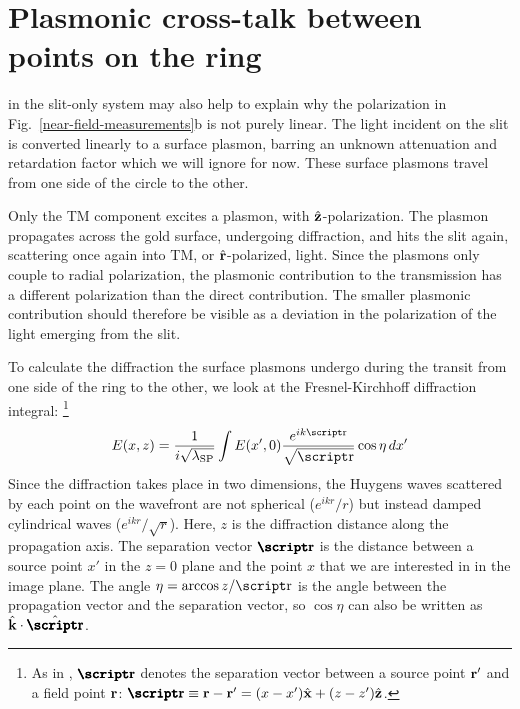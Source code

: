 \section{Plasmonic cross-talk between points on the ring}

 in the slit-only system may also help to explain why the polarization in Fig.~\ref{near-field-measurements}b is not purely linear.
The light incident on the slit is converted linearly to a surface plasmon, barring an unknown attenuation and retardation factor which we will ignore for now.
These surface plasmons travel from one side of the circle to the other.

Only the \gls{TM} component excites a plasmon, with $\hat{\mathbf{z}}$-polarization. The plasmon propagates across the gold surface, undergoing diffraction, and hits the slit again, scattering once again into \gls{TM}, or $\hat{\mathbf{r}}$-polarized, light.
Since the plasmons only couple to radial polarization, the plasmonic contribution to the transmission has a different polarization than the direct contribution.
The smaller plasmonic contribution should therefore be visible as a deviation in the polarization of the light emerging from the slit.

To calculate the diffraction the surface plasmons undergo during the transit from one side of the ring to the other, we look at the Fres\-nel-Kirch\-hoff diffraction integral:
\footnote{As in \textcite{Griffiths}, $\vrsep$ denotes the separation vector between a source point $\mathbf{r}'$ and a field point $\mathbf{r}$: $\vrsep \equiv \vect{r} - \vect{r}' = (x-x')\ux + (z-z')\uz$.}
\[ E(x,z) = \frac{1}{i\sqrt{\lambda_\SP}} \int E(x',0) \frac{e^{ik\rsep}}{\sqrt\rsep} \cos\eta \,dx' \]
Since the diffraction takes place in two dimensions, the Huygens waves scattered by each point on the wavefront are not spherical ($e^{ikr}/r$) but instead damped cylindrical waves\cite{Teperik2009} ($e^{ikr}/\sqrt{r}$).
Here, $z$ is the diffraction distance along the propagation axis.
The separation vector $\vrsep$ is the distance between a source point $x'$ in the $z=0$ plane and the point $x$ that we are interested in in the image plane.
The angle $\eta=\arccos z/\rsep$ is the angle between the propagation vector and the separation vector, so $\cos\eta$ can also be written as $\uvect{k}\cdot\ursep$.

